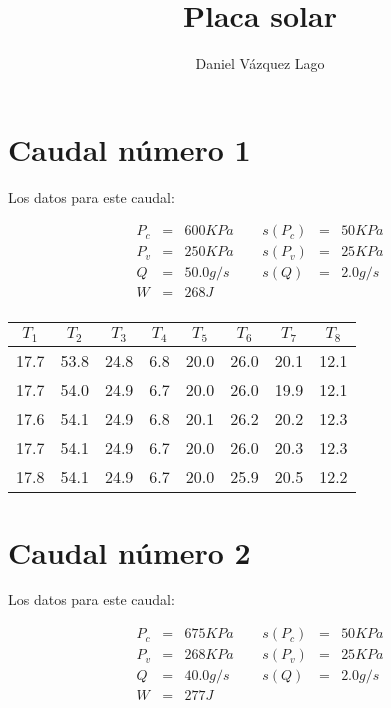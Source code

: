 \documentclass[12pt,a4paper]{article}
\author{Daniel Vázquez Lago}
\title{Placa solar}
\begin{document}
\maketitle

\newpage

\tableofcontents

\newpage

\section{Caudal número 1} 
 
Los datos para este caudal:  
 
\begin{equation} 
\begin{array}{lllllll}
P_c & = & 600 KPa &  \ \ &  s(P_c) & =  & 50  KPa \\ 
 P_v & = & 250 KPa &  \ \ &  s(P_v) & =  & 25  KPa\\ 
 Q & = & 50.0 g/s &  \ \ &  s(Q) & =  & 2.0  g/s \\ 
 W & = & 268 J & & & & \\ 
\end{array} 
\end{equation} 
 
\begin{table}[h!] 	 \centering 
\begin{tabular}{|c|c|c|c|c|c|c|c|} 
\hline 
$T_1$ & $T_2$ & $T_3$ & $T_4$ & $T_5$ & $T_6$ & $T_7$ & $T_8$ \\ \hline 
17.7 & 53.8 & 24.8 & 6.8 & 20.0 & 26.0 & 20.1 & 12.1  \\  
17.7 & 54.0 & 24.9 & 6.7 & 20.0 & 26.0 & 19.9 & 12.1  \\  
17.6 & 54.1 & 24.9 & 6.8 & 20.1 & 26.2 & 20.2 & 12.3  \\  
17.7 & 54.1 & 24.9 & 6.7 & 20.0 & 26.0 & 20.3 & 12.3  \\  
17.8 & 54.1 & 24.9 & 6.7 & 20.0 & 25.9 & 20.5 & 12.2  \\  
\hline 
\end{tabular} 
\label{tab:regresion1} 
\end{table} 
 
 
\section{Caudal número 2} 
 
Los datos para este caudal:  
 
\begin{equation} 
\begin{array}{lllllll}
P_c & = & 675 KPa &  \ \ &  s(P_c) & =  & 50  KPa \\ 
 P_v & = & 268 KPa &  \ \ &  s(P_v) & =  & 25  KPa\\ 
 Q & = & 40.0 g/s &  \ \ &  s(Q) & =  & 2.0  g/s \\ 
 W & = & 277 J & & & & \\ 
\end{array} 
\end{equation} 
 
\end{document}
